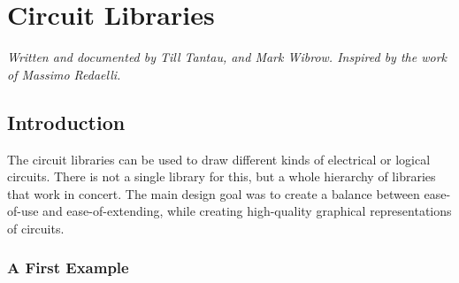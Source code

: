 %
%
%


\section{Circuit Libraries}
\label{section-library-circuits}

\emph{Written and documented by Till Tantau, and Mark Wibrow. Inspired
by the work of Massimo Redaelli.}


\subsection{Introduction}

The circuit libraries can be used to draw different kinds of electrical or
logical circuits. There is not a single library for this, but a whole hierarchy
of libraries that work in concert. The main design goal was to create a balance
between ease-of-use and ease-of-extending, while creating high-quality
graphical representations of circuits.
%
\begin{codeexample}
\end{codeexample}


\subsubsection{A First Example}

